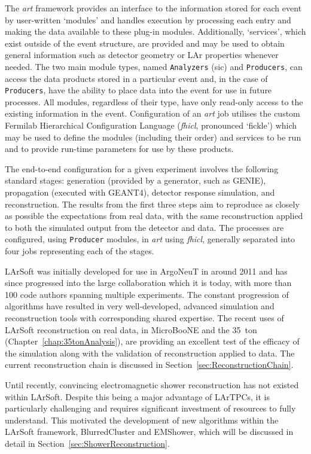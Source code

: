 The \textit{art} framework provides an interface to the information stored for each event by user-written `modules' and handles execution by processing each entry and making the data available to these plug-in modules.  Additionally, `services', which exist outside of the event structure, are provided and may be used to obtain general information such as detector geometry or LAr properties whenever needed.  The two main module types, named \texttt{Analyzers} (sic) and \texttt{Producers}, can access the data products stored in a particular event and, in the case of \texttt{Producers}, have the ability to place data into the event for use in future processes.  All modules, regardless of their type, have only read-only access to the existing information in the event.  Configuration of an \textit{art} job utilises the custom Fermilab Hierarchical Configuration Language (\textit{fhicl}, pronounced `fickle') which may be used to define the modules (including their order) and services to be run and to provide run-time parameters for use by these products.

The end-to-end configuration for a given experiment involves the following standard stages: generation (provided by a generator, such as GENIE), propagation (executed with GEANT4), detector response simulation, and reconstruction.  The results from the first three steps aim to reproduce as closely as possible the expectations from real data, with the same reconstruction applied to both the simulated output from the detector and data.  The processes are configured, using \texttt{Producer} modules, in \textit{art} using \textit{fhicl}, generally separated into four jobs representing each of the stages.

LArSoft was initially developed for use in ArgoNeuT in around 2011 and has since progressed into the large collaboration which it is today, with more than 100 code authors spanning multiple experiments.  The constant progression of algorithms have resulted in very well-developed, advanced simulation and reconstruction tools with corresponding shared expertise.  The recent uses of LArSoft reconstruction on real data, in MicroBooNE \cite{MicroBooNEReconstruction2017} and the 35~ton (Chapter~\ref{chap:35tonAnalysis}), are providing an excellent test of the efficacy of the simulation along with the validation of reconstruction applied to data.  The current reconstruction chain is discussed in Section~\ref{sec:ReconstructionChain}.

Until recently, convincing electromagnetic shower reconstruction has not existed within LArSoft.  Despite this being a major advantage of LArTPCs, it is particularly challenging and requires significant investment of resources to fully understand.  This motivated the development of new algorithms within the LArSoft framework, BlurredCluster and EMShower, which will be discussed in detail in Section~\ref{sec:ShowerReconstruction}.


